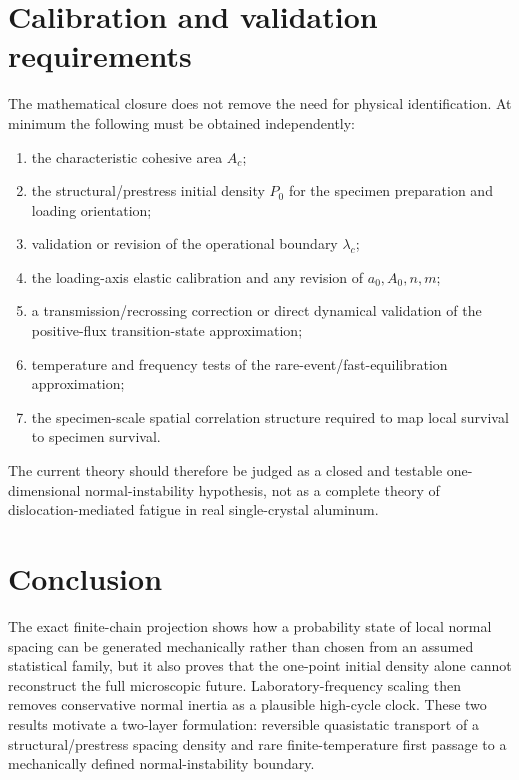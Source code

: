 \documentclass[11pt]{article}
\begin{document}
\section{Calibration and validation requirements}
The mathematical closure does not remove the need for physical identification. At minimum the following must be obtained independently:
\begin{enumerate}
\item the characteristic cohesive area $A_c$;
\item the structural/prestress initial density $P_0$ for the specimen preparation and loading orientation;
\item validation or revision of the operational boundary $\lambda_c$;
\item the loading-axis elastic calibration and any revision of $a_0,A_0,n,m$;
\item a transmission/recrossing correction or direct dynamical validation of the positive-flux transition-state approximation;
\item temperature and frequency tests of the rare-event/fast-equilibration approximation;
\item the specimen-scale spatial correlation structure required to map local survival to specimen survival.
\end{enumerate}
The current theory should therefore be judged as a closed and testable one-dimensional normal-instability hypothesis, not as a complete theory of dislocation-mediated fatigue in real single-crystal aluminum.

\section{Conclusion}
The exact finite-chain projection shows how a probability state of local normal spacing can be generated mechanically rather than chosen from an assumed statistical family, but it also proves that the one-point initial density alone cannot reconstruct the full microscopic future. Laboratory-frequency scaling then removes conservative normal inertia as a plausible high-cycle clock. These two results motivate a two-layer formulation: reversible quasistatic transport of a structural/prestress spacing density and rare finite-temperature first passage to a mechanically defined normal-instability boundary.
\end{document}
